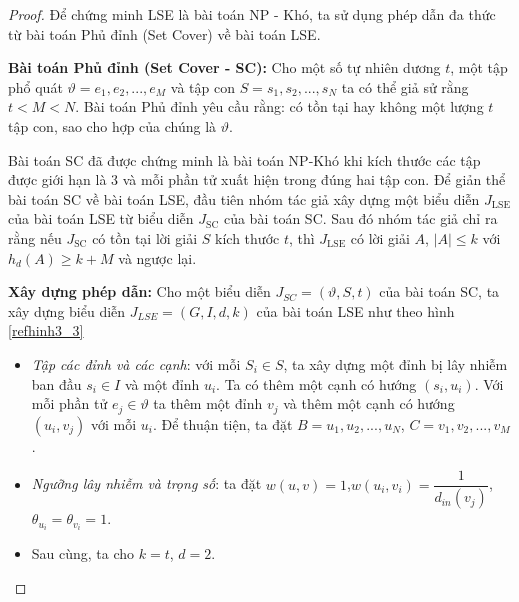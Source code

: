\begin{proof}
	Để chứng minh LSE là bài toán NP - Khó, ta sử dụng phép dẫn đa thức từ bài toán Phủ đỉnh (Set Cover) về bài toán LSE. 
	
	{\bfseries Bài toán Phủ đỉnh (Set Cover - SC):} Cho một số tự nhiên dương $t$, một tập phổ quát $\vartheta = {e_{1}, e_{2}, ... ,e_{M}}$ và tập con $S = {s_{1}, s_{2}, ... , s_{N}}$ ta có thể giả sử rằng $t < M < N$. Bài toán Phủ đỉnh yêu cầu rằng: có tồn tại hay không một lượng $t$ tập con, sao cho hợp của chúng là $\vartheta$.
	
	Bài toán SC đã được chứng minh là bài toán NP-Khó khi kích thước các tập được giới hạn là 3 và mỗi phần tử xuất hiện trong đúng hai tập con. Để giản thể bài toán SC về bài toán LSE, đầu tiên nhóm tác giả xây dựng một biểu diễn $J_{\text{LSE}}$ của bài toán LSE từ biểu diễn $J_{\text{SC}}$ của bài toán SC. Sau đó nhóm tác giả chỉ ra rằng nếu $J_{\text{SC}}$ có tồn tại lời giải $S$ kích thước $t$, thì $J_{\text{LSE}}$ có lời giải $A$, $| A | \leq k$ với $h_{d}(A) \geq k + M$ và ngược lại.
	
	{\bfseries Xây dựng phép dẫn:} Cho một biểu diễn $J_{SC} = (\vartheta, S, t)$ của bài toán SC, ta xây dựng biểu diễn $J_{LSE} = (G, I, d, k)$ của bài toán LSE như theo hình \ref{refhinh3_3}
	\begin {itemize}
	\item {\itshape Tập các đỉnh và các cạnh}: với mỗi $S_{i} \in S$, ta xây dựng một đỉnh bị lây nhiễm ban đầu $s_{i} \in I$ và một đỉnh $u_{i}$. Ta có thêm một cạnh có hướng $(s_{i}, u_{i})$. Với mỗi phần tử $e_{j} \in \vartheta$ ta thêm một đỉnh $v_{j}$ và thêm một cạnh có hướng $(u_{i},v_{j})$ với mỗi $u_{i}$. Để thuận tiện, ta đặt $B = {u_{1}, u_{2}, ... , u_{N}}$, $C = {v_{1}, v_{2}, ... , v_{M}}$.
	
	\item {\itshape Ngưỡng lây nhiễm và trọng số}: ta đặt $w(u,v) = 1$,\linebreak $w(u_{i}, v_{i}) = \dfrac{1}{d_{in}(v_{j})}$, $\theta_{u_{i}} = \theta_{v_{i}} = 1$.
	
	\item Sau cùng, ta cho $k = t$, $d = 2$. 		
	

\end{itemize}
\end{proof}
